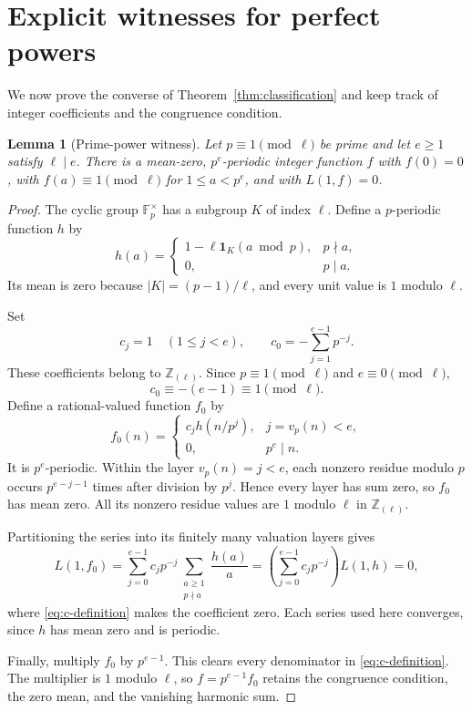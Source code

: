 \documentclass[11pt,a4paper]{article}
\newtheorem{lemma}[theorem]{Lemma}
\theoremstyle{definition}
\theoremstyle{remark}
\newcommand{\Z}{\mathbb Z}
\newcommand{\F}{\mathbb F}
\newcommand{\Zloc}{\Z_{(\ell)}}
\begin{document}
\section{Explicit witnesses for perfect powers}

We now prove the converse of Theorem~\ref{thm:classification} and keep
track of integer coefficients and the congruence condition.

\begin{lemma}[Prime-power witness]\label{lem:primepower-witness}
Let $p\equiv1\pmod\ell$ be prime and let $e\ge1$ satisfy $\ell\mid e$.
There is a mean-zero, $p^e$-periodic integer function $f$ with $f(0)=0$,
with $f(a)\equiv1\pmod\ell$ for $1\le a<p^e$, and with $L(1,f)=0$.
\end{lemma}

\begin{proof}
The cyclic group $\F_p^\times$ has a subgroup $K$ of index $\ell$.
Define a $p$-periodic function $h$ by
\begin{equation}\label{eq:h-definition}
 h(a)=
 \begin{cases}
 1-\ell\mathbf1_K(a\bmod p),&p\nmid a,\\
 0,&p\mid a.
 \end{cases}
\end{equation}
Its mean is zero because $|K|=(p-1)/\ell$, and every unit value is
$1$ modulo $\ell$.

Set
\begin{equation}\label{eq:c-definition}
 c_j=1\quad(1\le j<e),\qquad
 c_0=-\sum_{j=1}^{e-1}p^{-j}.
\end{equation}
These coefficients belong to $\Zloc$. Since $p\equiv1\pmod\ell$
and $e\equiv0\pmod\ell$,
\[
 c_0\equiv-(e-1)\equiv1\pmod\ell.
\]
Define a rational-valued function $f_0$ by
\begin{equation}\label{eq:valuation-witness}
 f_0(n)=
 \begin{cases}
 c_jh(n/p^j),&j=v_p(n)<e,\\
 0,&p^e\mid n.
 \end{cases}
\end{equation}
It is $p^e$-periodic. Within the layer $v_p(n)=j<e$, each nonzero
residue modulo $p$ occurs $p^{e-j-1}$ times after division by $p^j$.
Hence every layer has sum zero, so $f_0$ has mean zero. All its nonzero
residue values are $1$ modulo $\ell$ in $\Zloc$.

Partitioning the series into its finitely many valuation layers gives
\[
 L(1,f_0)
 =\sum_{j=0}^{e-1}c_jp^{-j}
   \sum_{\substack{a\ge1\\p\nmid a}}\frac{h(a)}a
 =\left(\sum_{j=0}^{e-1}c_jp^{-j}\right)L(1,h)=0,
\]
where \eqref{eq:c-definition} makes the coefficient zero. Each series
used here converges, since $h$ has mean zero and is periodic.

Finally, multiply $f_0$ by $p^{e-1}$. This clears every denominator in
\eqref{eq:c-definition}. The multiplier is $1$ modulo $\ell$, so
$f=p^{e-1}f_0$ retains the congruence condition, the zero mean, and
the vanishing harmonic sum.
\end{proof}
\end{document}
